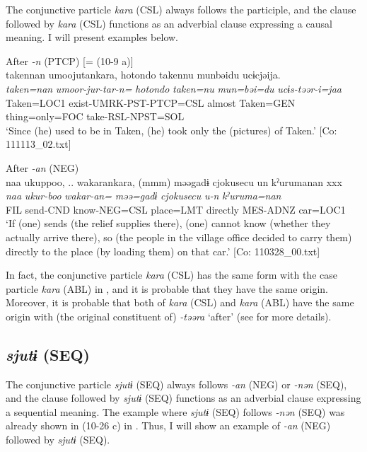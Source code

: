 The conjunctive particle \textit{kara} (CSL) always follows the participle, and the clause followed by \textit{kara} (CSL) functions as an adverbial clause expressing a causal meaning. I will present examples below.

\ea\label{ex:10.34}  
\ea After \textit{{}-n} (PTCP) [= (10-9 a)]\\
      \glll    takennan  umoojutankara,  {\textbar}hotondo{\textbar}  takennu   munbəidu  ucɨcjəija.\\
    \textit{taken=nan}  \textit{umoor-jur-tar-n=}  \textit{hotondo}  \textit{taken=nu}  \textit{mun=bəi=du}  \textit{ucɨs-təər-i=jaa}\\
    Taken=LOC1  exist-UMRK-PST-PTCP=CSL  almost  Taken=GEN   thing=only=FOC  take-RSL-NPST=SOL\\
\glt     ‘Since (he) used to be in Taken, (he) took only the (pictures) of Taken.’  [Co: 111113\_02.txt]

\ex After \textit{{}-an} (NEG)\\
      \glll    naa  ukuppoo, ..  wakarankara,  (mmm)  məəgadɨ  {\textbar}cjokusecu{\textbar} un  kˀurumanan  xxx\\
    \textit{naa}  \textit{ukur-boo}  \textit{wakar-an=}    \textit{məə=gadɨ}  \textit{cjokusecu}    \textit{u-n}  \textit{kˀuruma=nan}  \\
    FIL  send-CND  know-NEG=CSL    place=LMT  directly   MES-ADNZ  car=LOC1  \\
\glt     ‘If (one) sends (the relief supplies there), (one) cannot know (whether they actually arrive there), so (the people in the village office decided to carry them) directly to the place (by loading them) on that car.’  [Co: 110328\_00.txt]
\z
\z

  In fact, the conjunctive particle \textit{kara} (CSL) has the same form with the case particle \textit{kara} (ABL) in , and it is probable that they have the same origin. Moreover, it is probable that both of \textit{kara} (CSL) and \textit{kara} (ABL) have the same origin with (the original constituent of) \textit{{}-təəra} ‘after’ (see  for more details).

\subsection{\textit{sjutɨ} (SEQ)}\label{sec:10.2.4}

The conjunctive particle \textit{sjutɨ} (SEQ) always follows \textit{{}-an} (NEG) or \textit{{}-nən} (SEQ), and the clause followed by \textit{sjutɨ} (SEQ) functions as an adverbial clause expressing a sequential meaning. The example where \textit{sjutɨ} (SEQ) follows \textit{{}-nən} (SEQ) was already shown in (10-26 c) in . Thus, I will show an example of \textit{{}-an} (NEG) followed by \textit{sjutɨ} (SEQ).

